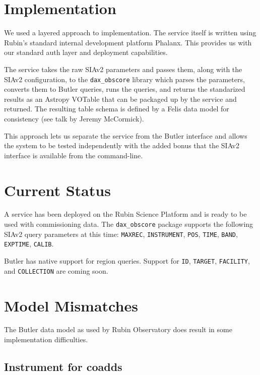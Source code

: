 \documentclass[11pt,twoside]{article}
\begin{document}
\section{Implementation}


We used a layered approach to implementation.
The service itself \citep{SQR-095} is written using Rubin's standard internal development platform Phalanx.
This provides us with our standard auth layer and deployment capabilities.

The service takes the raw SIAv2 parameters and passes them, along with the SIAv2 configuration, to the \texttt{dax\_obscore} library which parses the parameters, converts them to Butler queries, runs the queries, and returns the standarized results as an Astropy VOTable that can be packaged up by the service and returned.
The resulting table schema is defined by a Felis data model for consistency (see talk by Jeremy McCormick).

This approach lets us separate the service from the Butler interface and allows the system to be tested independently with the added bonus that the SIAv2 interface is available from the command-line.

\section{Current Status}

A service has been deployed on the Rubin Science Platform and is ready to be used with commissioning data.
The \texttt{dax\_obscore} package supports the following SIAv2 query parameters at this time:
\texttt{MAXREC},
\texttt{INSTRUMENT},
\texttt{POS},
\texttt{TIME},
\texttt{BAND},
\texttt{EXPTIME},
\texttt{CALIB}.

Butler has native support for region queries.
Support for
\texttt{ID},
\texttt{TARGET},
\texttt{FACILITY},
and \texttt{COLLECTION} are coming soon.

\section{Model Mismatches}

The Butler data model as used by Rubin Observatory does result in some implementation difficulties.

\subsection{Instrument for coadds}
\end{document}
